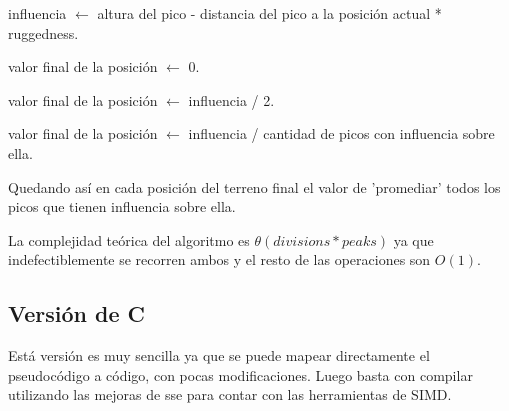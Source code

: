 \begin{algorithm}
\begin{algorithmic}

		\State influencia $\gets$ altura del pico - distancia del pico a la posición actual * ruggedness.
	\EndFor
	
		\State valor final de la posición $\gets$ 0.
	
		\State valor final de la posición $\gets$ influencia / 2.
	
		\State valor final de la posición $\gets$ influencia / cantidad de picos con influencia sobre ella.
		
	\EndIf

\EndFor

\end{algorithmic}
\end{algorithm}

Quedando así en cada posición del terreno final el valor de 'promediar' todos los picos que tienen influencia sobre ella.

La complejidad teórica del algoritmo es $\theta(divisions*peaks)$ ya que indefectiblemente se recorren ambos y el resto de las operaciones son $O(1)$.

\subsection{Versión de C}
Está versión es muy sencilla ya que se puede mapear directamente el pseudocódigo a código, con pocas modificaciones. Luego basta con compilar utilizando las mejoras de sse para contar con las herramientas de SIMD.


